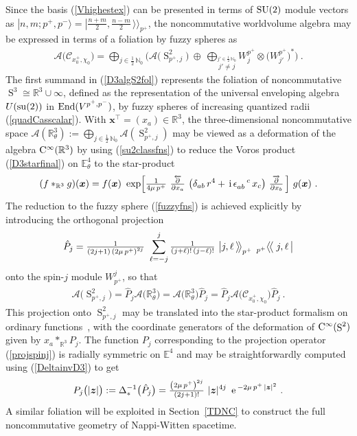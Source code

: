 \documentclass[11pt,a4paper]{article}
\DeclareMathOperator{\Sphere}{S}
\let\S\Sphere
\newcommand{\ii}{{\rm i}}
\newcommand{\mbf}[1]{{\boldsymbol {#1} }}
\def\ii{{\,{\rm i}\,}}
\def\mz{{\mbf z}}
\newcommand{\nat}{{\mathbb N}} %
\newcommand{\real}{{\mathbb R}} %
\newcommand{\eucl}{{\mathbb E}}
\def\e{{\,\rm e}\,}
\newcommand{\beq}{\begin{eqnarray}}
\newcommand{\eeq}{\end{eqnarray}}
\begin{document}
Since the basis (\ref{Vhighestex}) can be presented in terms of ${\rm
  SU}(2)$ module vectors as
$|n,m;p^+,p^-\rangle=|\frac{n+m}2,\frac{n-m}2\,\rangle\!\rangle_{p^+}$, the
noncommutative worldvolume algebra may be expressed in terms of a
foliation by fuzzy spheres as
\beq
\mathcal{A}\bigl(\mathcal{C}_{x_0^+,\chi^{~}_0}\bigr)=
\bigoplus_{j\in\frac12\,\nat_0}\Biggl(\mathcal{A}\bigl(\S^2_{p^+,j}\bigr)
{}~\oplus~\bigoplus_{\stackrel{\scriptstyle j'\in\frac12\,\nat_0}
{\scriptstyle j'\neq j}}W_j^{p^+}\otimes\bigl(W_{j'}^{p^+}\bigr)^*
\Biggr) \ .
\label{D3algS2fol}\eeq
The first summand in (\ref{D3algS2fol}) represents the foliation of
noncommutative $\S^3\cong\real^3\cup\infty$, defined as the representation of
the universal enveloping algebra $U({\rm su}(2))$ in ${\rm End}(V^{p^+,p^-})$,
by fuzzy spheres of increasing quantized radii (\ref{quadCasscalar}). With
$\mbf x^\top=(x_a)\in\real^3$, the three-dimensional noncommutative space
$\mathcal{A}(\real_\theta^3):=
\bigoplus_{j\in\frac12\,\nat_0}\mathcal{A}(\S^2_{p^+,j})$ may be
viewed as a deformation of the algebra ${\rm C}^\infty(\real^3)$ by
using (\ref{su2classfns}) to reduce the Voros product
(\ref{D3starfinal}) on $\eucl_\theta^4$ to the
star-product~\cite{HLS-J1}
\beq
(f*_{\real^3}g)(\mbf x)=f(\mbf x)~\exp\Bigl[\mbox{$\frac1{4\mu\,p^+}$}~
\mbox{$\frac{\overleftarrow{\partial}}{\partial x_a}$}\,\left(
\delta_{ab}\,r^4+\ii\epsilon_{ab}^{~~~c}\,x_c\right)\,
\mbox{$\frac{\overrightarrow{\partial}}{\partial x_b}$}\,\Bigr]~
g(\mbf x) \ .
\label{starprodR3}\eeq
The reduction to the fuzzy sphere (\ref{fuzzyfns}) is achieved explicitly by
introducing the orthogonal projection
\beq
\hat P_j=\mbox{$\frac1{(2j+1)\,\left(2\mu\,p^+\right)^{2j}}$}~
\sum_{\ell=-j}^j\mbox{$\frac1{(j+\ell)!\,(j-\ell)!}$}~
\bigl|j,\ell\,\bigr\rangle\!\!\!
\bigm\rangle_{p^+}\,{}^{~}_{p^+}\bigl\langle\!
\bigm\langle j,\ell\,\bigr|
\label{projspinj}\eeq
onto the spin-$j$ module $W_{p^+}^j$, so that
\beq
\mathcal{A}\bigl(\S^2_{p^+,j}\bigr)=\hat P_j\mathcal{A}\bigl
(\real_\theta^3\bigr)=\mathcal{A}\bigl
(\real_\theta^3\bigr)\hat P_j=\hat P_j\mathcal{A}\bigl(
\mathcal{C}_{x_0^+,\chi^{~}_0}\bigr)\hat P_j \ .
\label{fuzzyalgproj}\eeq
This projection onto $\S^2_{p^+,j}$ may be translated into the star-product
formalism on ordinary functions~\cite{HLS-J1}, with the coordinate
generators of the deformation of ${\rm C}^\infty(\S^2)$ given by
$x_a*_{\real^3}P_j$. The function $P_j$ corresponding to the projection
operator
(\ref{projspinj}) is radially symmetric on $\eucl^4$ and may
be straightforwardly computed using (\ref{DeltainvD3}) to get
\beq
P_j\bigl(|\mz|\bigr):=\Delta_*^{-1}\bigl(\hat P_j\bigr)
=\mbox{$\frac{\left(2\mu\,p^+\right)^{2j}}{(2j+1)!}$}~
|\mz|^{4j}~\e^{-2\mu\,p^+\,|\mz|^2} \ .
\label{projspinjfn}\eeq
A similar foliation will be exploited in Section~\ref{TDNC} to construct the
full noncommutative geometry of Nappi-Witten spacetime.
\end{document}

